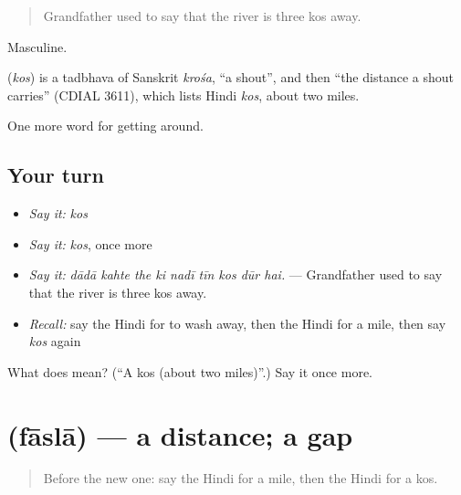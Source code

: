 \begin{quote}
Grandfather used to say that the river is three kos away.
\end{quote}

Masculine.

\begin{cousinweb}
\textbf{} (\emph{kos}) is a tadbhava of Sanskrit \emph{krośa}, \textquotedblleft{}a shout\textquotedblright{}, and then \textquotedblleft{}the distance a shout carries\textquotedblright{} (CDIAL 3611), which lists Hindi \emph{kos}, about two miles.
\end{cousinweb}

\begin{grammarlens}[title={What you've built}]
One more word for getting around.
\end{grammarlens}

\subsection*{Your turn}
\begin{itemize}
\raggedright
  \item \emph{Say it:} \emph{kos}
  \item \emph{Say it:} \emph{kos}, once more
  \item \emph{Say it:} \emph{dādā kahte the ki nadī tīn kos dūr hai.} — Grandfather used to say that the river is three kos away.
  \item \emph{Recall:} say the Hindi for to wash away, then the Hindi for a mile, then say \emph{kos} again
\end{itemize}

\begin{tcolorbox}[breakable,colback=teal!4,colframe=teal!35!black,title={Before you move on}]
What does  mean? (\textquotedblleft{}A kos (about two miles)\textquotedblright{}.) Say it once more.
\end{tcolorbox}
\section[\texorpdfstring{\hi{फ़ासला} (fāslā)}{फ़ासला (fāslā)}]{ (fāslā) — a distance; a gap}

\label{lesson:HI-C408-fasla}



\begin{quote}
Before the new one: say the Hindi for a mile, then the Hindi for a kos.
\end{quote}

